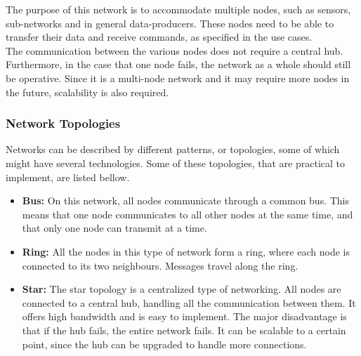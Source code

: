 The purpose of this network is to accommodate multiple nodes, such as sensors, sub-networks and in general data-producers.
These nodes need to be able to transfer their data and receive commands, as specified in the use cases.
\\
The communication between the various nodes does not require a central hub.
Furthermore, in the case that one node fails, the network as a whole should still be operative.
Since it is a multi-node network and it may require more nodes in the future, scalability is also required.

\subsubsection*{Network Topologies}
Networks can be described by different patterns, or topologies, some of which might have several technologies.
Some of these topologies, that are practical to implement, are listed bellow.
\begin{itemize}
\item \textbf{Bus:}
On this network, all nodes communicate through a common bus. 
This means that one node communicates to all other nodes at the same time, and that only one node can transmit at a time.
\item \textbf{Ring:} All the nodes in this type of network form a ring, where each node is connected to its two neighbours.
Messages travel along the ring.
\item \textbf{Star:} The star topology is a centralized type of networking.
All nodes are connected to a central hub, handling all the communication between them.
It offers high bandwidth and is easy to implement.
The major disadvantage is that if the hub fails, the entire network fails.
It can be scalable to a certain point, since the hub can be upgraded to handle more connections.
\end{itemize}

